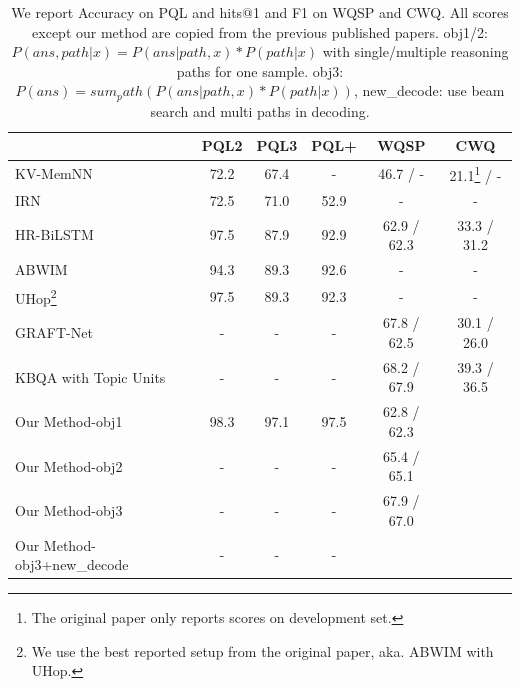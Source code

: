 \begin{table}[h]\centering
\begin{tabular}{|l|c|c|c|c|c|}
\hline
                            & PQL2 & PQL3 & PQL+ & WQSP & CWQ \\
\hline
KV-MemNN \cite{DBLP:conf/emnlp/MillerFDKBW16}    & 72.2 & 67.4 & -    & 46.7 / - & 21.1\footnote{The original paper only reports scores on development set.} / -      \\
IRN \cite{DBLP:conf/coling/ZhouHZ18}                         & 72.5 & 71.0   & 52.9 & -    & -         \\
HR-BiLSTM \cite{DBLP:conf/acl/YuYHSXZ17}                  & 97.5 & 87.9 & 92.9 & 62.9 / 62.3 & 33.3 / 31.2         \\
ABWIM \cite{DBLP:journals/corr/abs-1801-09893}                      & 94.3 & 89.3 & 92.6 & -    & -         \\
UHop\footnote{We use the best reported setup from the original paper, aka. ABWIM with UHop.} \cite{DBLP:conf/naacl/ChenCCNK19}                       & 97.5 & 89.3 & 92.3 & -    & -         \\
GRAFT-Net \cite{DBLP:conf/emnlp/SunDZMSC18}                  & -    & -    & -    & 67.8 / 62.5 & 30.1 / 26.0      \\
KBQA with Topic Units \cite{DBLP:conf/ijcai/LanW019}                  & -    & -    & -    & 68.2 / 67.9 & 39.3 / 36.5      \\
\hline
Our Method-obj1             & 98.3 & 97.1 & 97.5 &    62.8 / 62.3  &           \\
Our Method-obj2             &   -   &   -   &   -   &  65.4 / 65.1     &           \\
Our Method-obj3             &     - &  -    &   -   &   67.9 / 67.0    &           \\
Our Method-obj3+new\_decode & -     &   -   &    -   &     &          \\
\hline
\end{tabular}
\caption{\fontsize{10}{12}\selectfont We report Accuracy on PQL and hits@1 and F1 on WQSP and CWQ. All scores except our method are copied from the previous published papers. obj1/2: $P(ans, path|x)= P(ans|path,x)*P(path|x)$ with single/multiple reasoning paths for one sample. obj3: $P(ans) = sum_path(P(ans|path,x)*P(path|x))$, new\_decode: use beam search and multi paths in decoding.}\label{tab:main}
\end{table}


